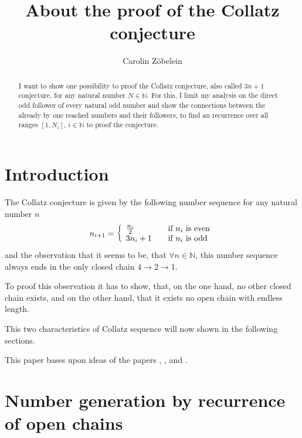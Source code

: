 \documentclass{aomart}
\title[About the proof of the Collatz conjecture]{About the proof of the Collatz conjecture}
\author{Carolin Z\"obelein}
\theoremstyle{definition}
\begin{document}
\begin{abstract}
	I want to show one possibility to proof the Collatz conjecture, also called $3n+1$ conjecture, for any natural number $N \in \mathbb{N}$. For this, I limit my analysis on the direct odd follower of every natural odd number and show the connections between the already by one reached numbers and their followers, to find an recurrence over all ranges $[1,N_{i}]$, $i \in \mathbb{N}$ to proof the conjecture.
\end{abstract}

\maketitle
\tableofcontents

\section{Introduction}
\label{s:int}
The Collatz conjecture is given by the following number sequence for any natural number $n$
\begin{equation} n_{i+1} = \left\{
	\begin{array}{l@{\quad \quad}l}
	\frac{n_{i}}{2} & \textnormal{if $n_{i}$ is even} \\
	3n_{i}+1 & \textnormal{if $n_{i}$ is odd}
	\end{array}
\right. \label{eq:collatz} \end{equation} 
and the observation that it seems to be, that $\forall n \in \mathbb{N}$, this number sequence always ends in the only closed chain $4 \rightarrow 2 \rightarrow 1$.

To proof this observation it has to show, that, on the one hand, no other closed chain exists, and on the other hand, that it exists no open chain with endless length. 

This two characteristics of Collatz sequence will now shown in the following sections.

This paper bases upon ideas of the papers \cite{Work2s3s}, \cite{OnCp}, \cite{BouCc} and \cite{2011arXiv1108.4056L}.
\section{Number generation by recurrence of open chains}
\label{s:genopch}
\end{document}
